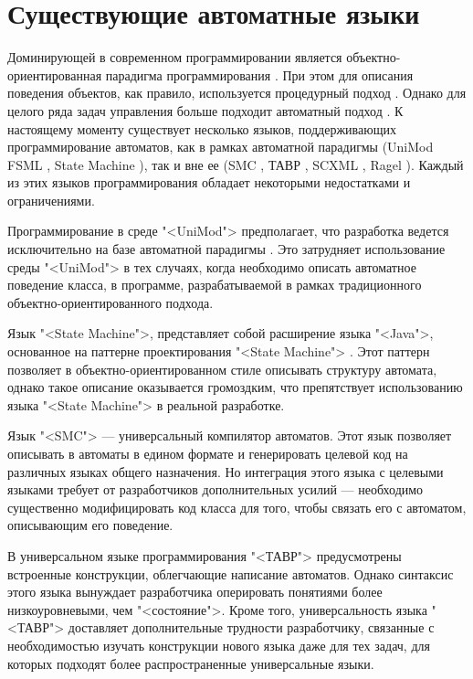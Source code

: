 \section{Существующие автоматные языки}
Доминирующей в современном программировании является объектно-ориентированная парадигма программирования \cite{meyer}. При этом для описания поведения объектов, как правило, используется процедурный подход \cite{nepeyvoda}. Однако для целого ряда задач управления больше подходит автоматный подход \cite{shalyto01,shalyto02}. К настоящему моменту существует несколько языков, поддерживающих программирование автоматов, как в рамках автоматной парадигмы (UniMod FSML \cite{lagunov}, State Machine \cite{shamgunov}), так и вне ее (SMC \cite{smc}, ТАВР \cite{tsimbaluk}, SCXML \cite{scxml}, Ragel \cite{ragel}). Каждый из этих языков программирования обладает некоторыми недостатками и ограничениями.

Программирование в среде "<UniMod"> предполагает, что разработка ведется исключительно на базе автоматной парадигмы \cite{myUMLSwitchEclipse}. Это затрудняет использование среды "<UniMod"> в тех случаях, когда необходимо описать автоматное поведение класса, в программе, разрабатываемой в рамках традиционного объектно-ориентированного подхода.

Язык "<State Machine">, представляет собой расширение языка "<Java">, основанное на паттерне проектирования "<State Machine"> \cite{gof}. Этот паттерн позволяет в объектно-ориентированном стиле описывать структуру автомата, однако такое описание оказывается громоздким, что препятствует использованию языка "<State Machine"> в реальной разработке.

Язык "<SMC"> --- универсальный компилятор автоматов. Этот язык позволяет описывать в автоматы в едином формате и генерировать целевой код на различных языках общего назначения. Но интеграция этого языка с целевыми языками требует от разработчиков дополнительных усилий --- необходимо существенно модифицировать код класса для того, чтобы связать его с автоматом, описывающим его поведение.

В универсальном языке программирования "<ТАВР"> предусмотрены встроенные конструкции, облегчающие написание автоматов. Однако синтаксис этого языка вынуждает разработчика оперировать понятиями более низкоуровневыми, чем "<состояние">. Кроме того, универсальность языка "<ТАВР"> доставляет дополнительные трудности разработчику, связанные с необходимостью изучать конструкции нового языка даже для тех задач, для которых подходят более распространенные универсальные языки.

